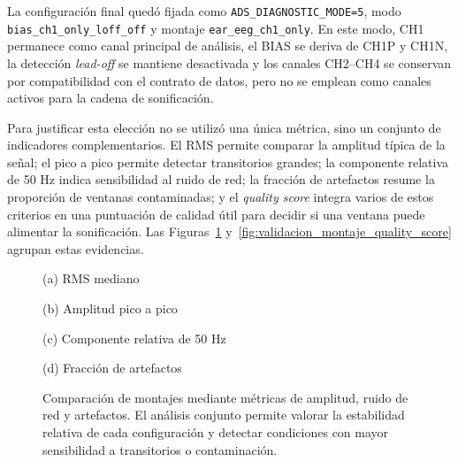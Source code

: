 La configuración final quedó fijada como \texttt{ADS\_DIAGNOSTIC\_MODE=5}, modo \texttt{bias\_ch1\_only\_loff\_off} y montaje \texttt{ear\_eeg\_ch1\_only}. En este modo, CH1 permanece como canal principal de análisis, el BIAS se deriva de CH1P y CH1N, la detección \textit{lead-off} se mantiene desactivada y los canales CH2--CH4 se conservan por compatibilidad con el contrato de datos, pero no se emplean como canales activos para la cadena de sonificación.

Para justificar esta elección no se utilizó una única métrica, sino un conjunto de indicadores complementarios. El RMS permite comparar la amplitud típica de la señal; el pico a pico permite detectar transitorios grandes; la componente relativa de 50 Hz indica sensibilidad al ruido de red; la fracción de artefactos resume la proporción de ventanas contaminadas; y el \textit{quality score} integra varios de estos criterios en una puntuación de calidad útil para decidir si una ventana puede alimentar la sonificación. Las Figuras~\ref{fig:validacion_montaje_metricas} y~\ref{fig:validacion_montaje_quality_score} agrupan estas evidencias.

\begin{figure}[!htbp]
    \centering
    \begin{minipage}{0.48\textwidth}
        \centering
        \small (a) RMS mediano
    \end{minipage}
    \hfill
    \begin{minipage}{0.48\textwidth}
        \centering
        \small (b) Amplitud pico a pico
    \end{minipage}

    \vspace{0.25cm}

    \begin{minipage}{0.48\textwidth}
        \centering
        \small (c) Componente relativa de 50 Hz
    \end{minipage}
    \hfill
    \begin{minipage}{0.48\textwidth}
        \centering
        \small (d) Fracción de artefactos
    \end{minipage}
    \caption{Comparación de montajes mediante métricas de amplitud, ruido de red y artefactos. El análisis conjunto permite valorar la estabilidad relativa de cada configuración y detectar condiciones con mayor sensibilidad a transitorios o contaminación.}
    \label{fig:validacion_montaje_metricas}
\end{figure}

